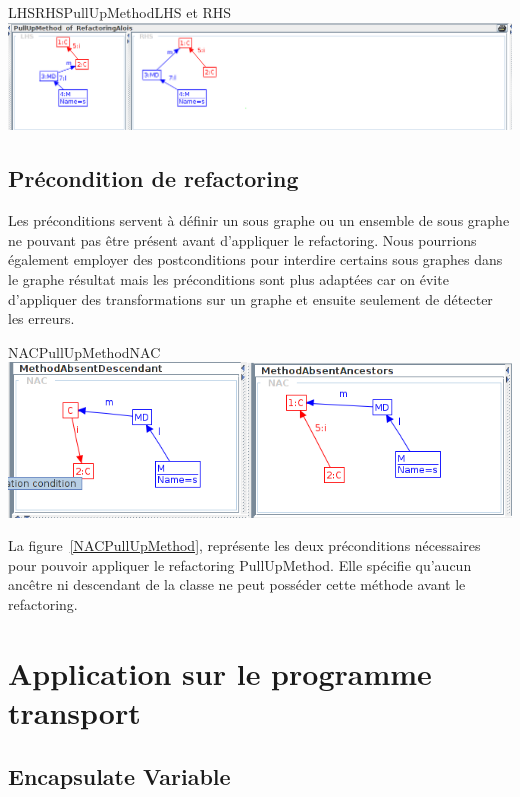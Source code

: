 \documentclass[a4paper, 12pt]{article}
\begin{document}
  \begin{myfig}{LHSRHSPullUpMethod}{LHS et RHS}
    \includegraphics[width=\textwidth]{LHSRHSPullUpMethod.png}
  \end{myfig}

  \subsection{Précondition de refactoring}
  Les préconditions servent à définir un sous graphe ou un ensemble de sous graphe ne pouvant pas être présent avant d'appliquer le refactoring.
  Nous pourrions également employer des postconditions pour interdire certains sous graphes dans le graphe résultat
  mais les préconditions sont plus adaptées car on évite d'appliquer des transformations sur un graphe et ensuite seulement de détecter les erreurs.

  \begin{myfig}{NACPullUpMethod}{NAC}
    \includegraphics[width=\textwidth]{NACPullUpMethod.png}
  \end{myfig}

  La figure~\ref{NACPullUpMethod}, représente les deux préconditions nécessaires pour pouvoir appliquer le refactoring PullUpMethod.
  Elle spécifie qu'aucun ancêtre ni descendant de la classe ne peut posséder cette méthode avant le refactoring.


  \section{Application sur le programme transport}

  \subsection{Encapsulate Variable}
\end{document}
